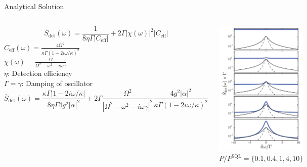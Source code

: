 \documentclass{beamer}
\begin{document}
\begin{frame}{Analytical Solution}
	\begin{columns}
		$$
		\overline S_\text{det}(\omega)
		= \frac{1}{8 \eta \Gamma |C_\text{eff}|}
		+ 2 \Gamma |\chi(\omega)|^2 |C_\text{eff}|
		$$
		$C_\text{eff}(\omega) = \frac{4 G^2}{\kappa \Gamma(1-2 i\omega /\kappa)^2}$\\
		$\chi(\omega) = \frac{\Omega}{\Omega^2 - \omega^2 - i\omega\gamma}$ \\
		$\eta$: Detection efficiency\\
		$\Gamma = \gamma$: Damping of oscillator\\
		
		\tiny 
		$$
		\overline S_\text{det}(\omega)
		= \frac{\kappa\Gamma |1-2i\omega/\kappa|}{8 \eta \Gamma 4 g^2 |\alpha|^2}
		+ 2 \Gamma \frac{\Omega^2}{|\Omega^2-\omega^2-i\omega\gamma|^2}
		\frac{4 g^2 |\alpha|^2}{\kappa \Gamma(1-2 i\omega /\kappa)^2}
		$$
		

		\small\centering
		\includegraphics[width=\textwidth]{figures/3.5.png}
		$P/P^\text{SQL} = \{0.1, 0.4, 1, 4, 10\}$

	\end{columns}
\end{frame}
\end{document}
